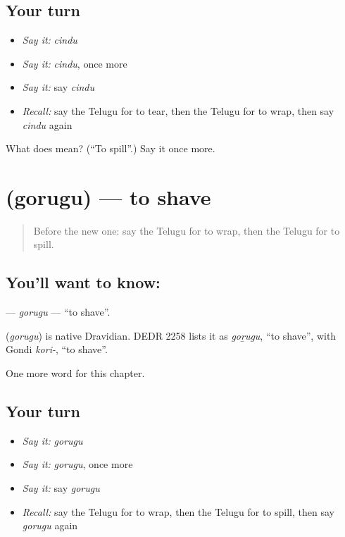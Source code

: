 \subsection*{Your turn}
\begin{itemize}
\raggedright
  \item \emph{Say it:} \emph{cindu}
  \item \emph{Say it:} \emph{cindu}, once more
  \item \emph{Say it:} say \emph{cindu}
  \item \emph{Recall:} say the Telugu for to tear, then the Telugu for to wrap, then say \emph{cindu} again
\end{itemize}

\begin{tcolorbox}[breakable,colback=teal!4,colframe=teal!35!black,title={Before you move on}]
What does  mean? (\textquotedblleft{}To spill\textquotedblright{}.) Say it once more.
\end{tcolorbox}
\section[\texorpdfstring{\te{గొరుగు} (gorugu)}{గొరుగు (gorugu)}]{ (gorugu) — to shave}

\label{lesson:TE-C165-gorugu}



\begin{quote}
Before the new one: say the Telugu for to wrap, then the Telugu for to spill.
\end{quote}

\subsection*{You'll want to know: }
\textbf{} — \emph{gorugu} — \textquotedblleft{}to shave\textquotedblright{}.

\begin{cousinweb}
\textbf{} (\emph{gorugu}) is native Dravidian. DEDR 2258 lists it as \emph{goṟugu}, \textquotedblleft{}to shave\textquotedblright{}, with Gondi \emph{kori-}, \textquotedblleft{}to shave\textquotedblright{}.
\end{cousinweb}

\begin{grammarlens}[title={What you've built}]
One more word for this chapter.
\end{grammarlens}

\subsection*{Your turn}
\begin{itemize}
\raggedright
  \item \emph{Say it:} \emph{gorugu}
  \item \emph{Say it:} \emph{gorugu}, once more
  \item \emph{Say it:} say \emph{gorugu}
  \item \emph{Recall:} say the Telugu for to wrap, then the Telugu for to spill, then say \emph{gorugu} again
\end{itemize}


